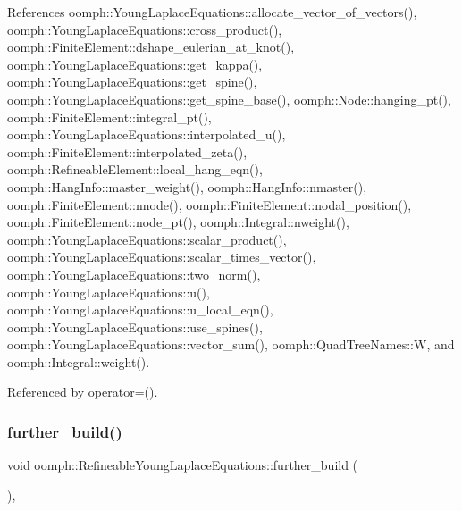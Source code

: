 References oomph\+::\+Young\+Laplace\+Equations\+::allocate\+\_\+vector\+\_\+of\+\_\+vectors(), oomph\+::\+Young\+Laplace\+Equations\+::cross\+\_\+product(), oomph\+::\+Finite\+Element\+::dshape\+\_\+eulerian\+\_\+at\+\_\+knot(), oomph\+::\+Young\+Laplace\+Equations\+::get\+\_\+kappa(), oomph\+::\+Young\+Laplace\+Equations\+::get\+\_\+spine(), oomph\+::\+Young\+Laplace\+Equations\+::get\+\_\+spine\+\_\+base(), oomph\+::\+Node\+::hanging\+\_\+pt(), oomph\+::\+Finite\+Element\+::integral\+\_\+pt(), oomph\+::\+Young\+Laplace\+Equations\+::interpolated\+\_\+u(), oomph\+::\+Finite\+Element\+::interpolated\+\_\+zeta(), oomph\+::\+Refineable\+Element\+::local\+\_\+hang\+\_\+eqn(), oomph\+::\+Hang\+Info\+::master\+\_\+weight(), oomph\+::\+Hang\+Info\+::nmaster(), oomph\+::\+Finite\+Element\+::nnode(), oomph\+::\+Finite\+Element\+::nodal\+\_\+position(), oomph\+::\+Finite\+Element\+::node\+\_\+pt(), oomph\+::\+Integral\+::nweight(), oomph\+::\+Young\+Laplace\+Equations\+::scalar\+\_\+product(), oomph\+::\+Young\+Laplace\+Equations\+::scalar\+\_\+times\+\_\+vector(), oomph\+::\+Young\+Laplace\+Equations\+::two\+\_\+norm(), oomph\+::\+Young\+Laplace\+Equations\+::u(), oomph\+::\+Young\+Laplace\+Equations\+::u\+\_\+local\+\_\+eqn(), oomph\+::\+Young\+Laplace\+Equations\+::use\+\_\+spines(), oomph\+::\+Young\+Laplace\+Equations\+::vector\+\_\+sum(), oomph\+::\+Quad\+Tree\+Names\+::W, and oomph\+::\+Integral\+::weight().



Referenced by operator=().

\mbox{\label{classoomph_1_1RefineableYoungLaplaceEquations_a9c663f1cb9fec2a0d5ec263313741e74}} 
\subsubsection{\texorpdfstring{further\+\_\+build()}{further\_build()}}
{\footnotesize\ttfamily void oomph\+::\+Refineable\+Young\+Laplace\+Equations\+::further\+\_\+build (\begin{DoxyParamCaption}{ }\end{DoxyParamCaption})\hspace{0.3cm}{\ttfamily [inline]}, {\ttfamily [virtual]}}



